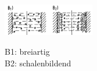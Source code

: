 \begin{minipage}{0.6\linewidth}
    \includegraphics[width = 40mm]{src/images/Endogene Erstarrung.png}
\end{minipage}
\begin{minipage}{0.3\linewidth}
    B1: breiartig\\
    B2: schalenbildend\\
\end{minipage}